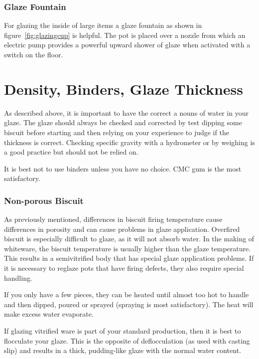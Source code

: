 \subsubsection{Glaze Fountain}
For glazing the inside of large items a glaze fountain as shown in 
figure~\ref{fig:glazingcup} is helpful. The pot is placed over a nozzle from 
which an electric pump provides a powerful upward shower of glaze when 
activated with a switch on the floor.
\section{Density, Binders, Glaze Thickness}
As described above, it is important to have the correct a nouns of water in 
your glaze. The glaze should always be checked and corrected by test dipping 
some biscuit before starting and then relying on your experience to judge if 
the thickness is correct. Checking specific gravity with a hydrometer or by 
weighing is a good practice but should not be relied on.

It is best not to use binders unless you have no choice. CMC gum is the most 
satisfactory.
\subsubsection{Non-porous Biscuit}
As previously mentioned, differences in biscuit firing temperature cause 
differences in porosity and can cause problems in glaze application. Overfired 
biscuit is especially difficult to glaze, as it will not absorb water. In the 
making of whiteware, the biscuit temperature is usually higher than the glaze 
temperature. This results in a semivitrified body that has special glaze 
application problems. If it is necessary to reglaze pots that have firing 
defects, they also require special handling.

If you only have a few pieces, they can be heated until almost too hot to 
handle and then dipped, poured or sprayed (spraying is most satisfactory). The 
heat will make excess water evaporate.

If glazing vitrified ware is part of your standard production, then it is best 
to flocculate your glaze. This is the opposite of deflocculation (as used with 
casting slip) and results in a thick, pudding-like glaze with the normal water 
content.
